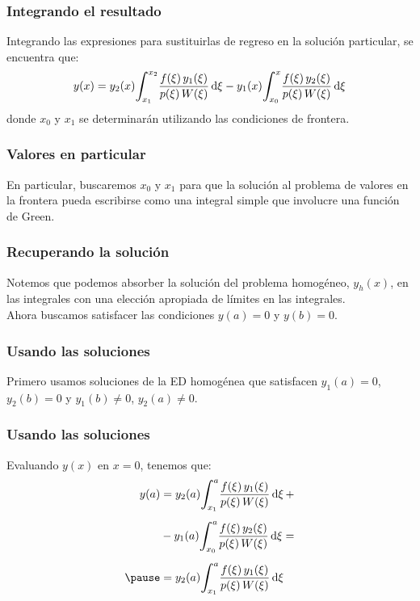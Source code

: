 \documentclass[12pt]{beamer}
\begin{document}
\begin{frame}
\frametitle{Integrando el resultado}
Integrando las expresiones para sustituirlas de regreso en la solución particular, se encuentra que:
\pause
\begin{align*}
y (x) = y_{2} (x) \scaleint{6ex}_{\bs x_{1}}^{x_{2}} \dfrac{f (\xi) \, y_{1} (\xi)}{p (\xi) \, W (\xi)} \dd{\xi} - y_{1} (x) \scaleint{6ex}_{\bs x_{0}}^{x} \dfrac{f (\xi) \, y_{2} (\xi)}{p (\xi) \, W (\xi)} \dd{\xi}
\end{align*}
donde $x_{0}$ y $x_{1}$ se determinarán utilizando las condiciones de frontera.
\end{frame}

\begin{frame}
\frametitle{Valores en particular}
En particular, buscaremos $x_{0}$ y $x_{1}$ para que la solución al problema de valores en la frontera pueda escribirse como una integral simple que involucre una función de Green.
\end{frame}

\begin{frame}
\frametitle{Recuperando la solución}
Notemos que podemos absorber la solución del problema homogéneo, $y_{h} (x)$, en las integrales con una elección apropiada de límites en las integrales.
\\
\bigskip
\pause
Ahora buscamos satisfacer las condiciones $y (a) = 0$ y $y (b) = 0$.
\end{frame}

\begin{frame}
\frametitle{Usando las soluciones}
Primero usamos soluciones de la ED homogénea que satisfacen $y_{1} (a) = 0$, $y_{2} (b) = 0$ y $y_{1} (b) \neq 0$, $y_{2} (a) \neq 0$.
\end{frame}

\begin{frame}
\frametitle{Usando las soluciones}
Evaluando $y (x)$ en $x = 0$, tenemos que:
\pause
\begin{eqnarray}
\begin{aligned}[b]
y (a) &= y_{2} (a) \scaleint{6ex}_{\bs x_{1}}^{a} \dfrac{f (\xi) \, y_{1} (\xi)}{p (\xi) \, W (\xi)} \dd{\xi} + \\[0.5em] 
&- y_{1} (a) \scaleint{6ex}_{\bs x_{0}}^{a} \dfrac{f (\xi) \, y_{2} (\xi)}{p (\xi) \, W (\xi)} \dd{\xi} = \\[0.5em] \pause
&= y_{2} (a) \scaleint{6ex}_{\bs x_{1}}^{a} \dfrac{f (\xi) \, y_{1} (\xi)}{p (\xi) \, W (\xi)} \dd{\xi}
\end{aligned}
\label{eq:ecuacion_07_27}
\end{eqnarray}
\end{frame}
\end{document}
